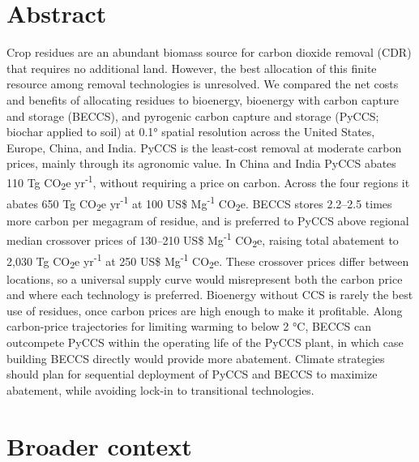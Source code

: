 \documentclass[
  letterpaper,
  twoside,
  twocolumn,
  9pt]{article}
\begin{document}


\section*{Abstract}\label{abstract}

Crop residues are an abundant biomass source for carbon dioxide removal
(CDR) that requires no additional land. However, the best allocation of
this finite resource among removal technologies is unresolved. We
compared the net costs and benefits of allocating residues to bioenergy,
bioenergy with carbon capture and storage (BECCS), and pyrogenic carbon
capture and storage (PyCCS; biochar applied to soil) at 0.1° spatial
resolution across the United States, Europe, China, and India. PyCCS is
the least-cost removal at moderate carbon prices, mainly through its
agronomic value. In China and India PyCCS abates 110 Tg
CO\textsubscript{2}e yr\textsuperscript{-1}, without requiring a price
on carbon. Across the four regions it abates 650 Tg CO\textsubscript{2}e
yr\textsuperscript{-1} at 100 US\$ Mg\textsuperscript{-1}
CO\textsubscript{2}e. BECCS stores 2.2--2.5 times more carbon per
megagram of residue, and is preferred to PyCCS above regional median
crossover prices of 130--210 US\$ Mg\textsuperscript{-1}
CO\textsubscript{2}e, raising total abatement to 2,030 Tg
CO\textsubscript{2}e yr\textsuperscript{-1} at 250 US\$
Mg\textsuperscript{-1} CO\textsubscript{2}e. These crossover prices
differ between locations, so a universal supply curve would misrepresent
both the carbon price and where each technology is preferred. Bioenergy
without CCS is rarely the best use of residues, once carbon prices are
high enough to make it profitable. Along carbon-price trajectories for
limiting warming to below 2 °C, BECCS can outcompete PyCCS within the
operating life of the PyCCS plant, in which case building BECCS directly
would provide more abatement. Climate strategies should plan for
sequential deployment of PyCCS and BECCS to maximize abatement, while
avoiding lock-in to transitional technologies.

\section*{Broader context}\label{broader-context}
\end{document}

